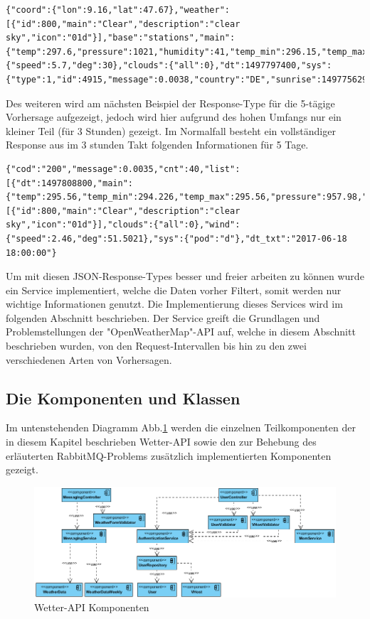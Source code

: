   \begin{lstlisting}
{"coord":{"lon":9.16,"lat":47.67},"weather":[{"id":800,"main":"Clear","description":"clear sky","icon":"01d"}],"base":"stations","main":{"temp":297.6,"pressure":1021,"humidity":41,"temp_min":296.15,"temp_max":298.15},"visibility":10000,"wind":{"speed":5.7,"deg":30},"clouds":{"all":0},"dt":1497797400,"sys":{"type":1,"id":4915,"message":0.0038,"country":"DE","sunrise":1497756293,"sunset":1497813872},"id":0,"name":"Konstanz","cod":200}
\end{lstlisting}

Des weiteren wird am nächsten Beispiel der Response-Type für die 5-tägige Vorhersage aufgezeigt, jedoch wird hier aufgrund des hohen Umfangs nur ein kleiner Teil (für 3 Stunden) gezeigt. Im Normalfall besteht ein vollständiger Response aus im 3 stunden Takt 
folgenden Informationen für 5 Tage.
 
  \begin{lstlisting}
{"cod":"200","message":0.0035,"cnt":40,"list":[{"dt":1497808800,"main":{"temp":295.56,"temp_min":294.226,"temp_max":295.56,"pressure":957.98,"sea_level":1034.02,"grnd_level":957.98,"humidity":53,"temp_kf":1.34},"weather":[{"id":800,"main":"Clear","description":"clear sky","icon":"01d"}],"clouds":{"all":0},"wind":{"speed":2.46,"deg":51.5021},"sys":{"pod":"d"},"dt_txt":"2017-06-18 18:00:00"}
\end{lstlisting}
\clearpage
Um mit diesen JSON-Response-Types besser und freier arbeiten zu können wurde ein Service implementiert, welche die Daten vorher Filtert, somit werden nur wichtige Informationen genutzt. Die Implementierung dieses Services wird im folgenden Abschnitt beschrieben. Der Service greift die Grundlagen und Problemstellungen der "OpenWeatherMap"-API auf, welche in diesem Abschnitt beschrieben wurden, von den Request-Intervallen bis hin zu den zwei verschiedenen Arten von Vorhersagen.

\subsection{Die Komponenten und Klassen}

Im untenstehenden Diagramm Abb.\ref{img:KomponentenWetterAPI} werden die einzelnen Teilkomponenten der in diesem Kapitel beschrieben Wetter-API sowie den zur Behebung des erläuterten RabbitMQ-Problems zusätzlich implementierten Komponenten gezeigt.

\begin{figure}[!ht]
	\centering
	\includegraphics[width=1.0\textwidth]{Bilder/WetterApiKomponentendiagramm.PNG}
	\caption{Wetter-API Komponenten}
	\label{img:KomponentenWetterAPI}
\end{figure} 

